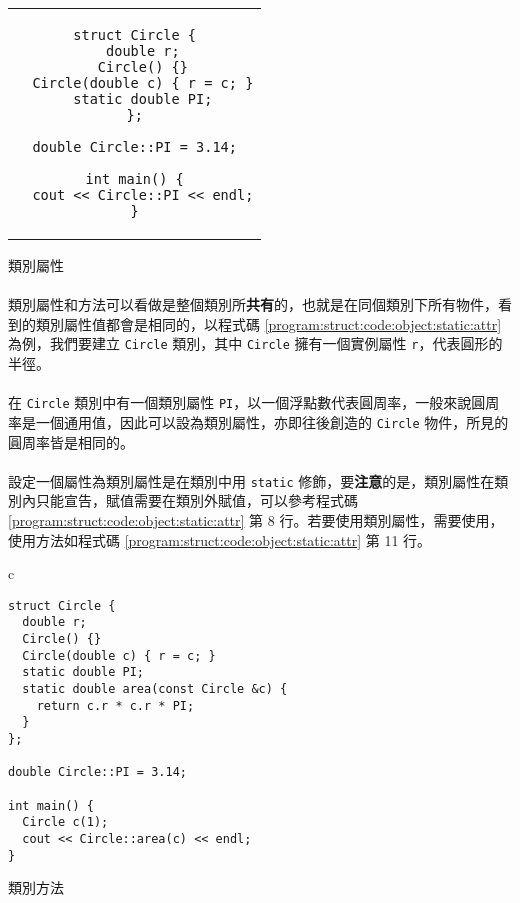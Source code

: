 \documentclass[12pt,a4paper,oneside]{report}
\begin{document}
\begin{CJK}{UTF8}{bkai}
\begin{code}[h!]
\centering
\begin{tabular}{c}
\begin{lstlisting}
struct Circle {
  double r;
  Circle() {}
  Circle(double c) { r = c; }
  static double PI;
};

double Circle::PI = 3.14;

int main() {
  cout << Circle::PI << endl;
}
\end{lstlisting}
\end{tabular}
\caption{類別屬性}
\label{program:struct:code:object:static:attr}
\end{code}

\paragraph{}類別屬性和方法可以看做是整個類別所\textbf{共有}的，也就是在同個類別下所有物件，看到的類別屬性值都會是相同的，以程式碼 \ref{program:struct:code:object:static:attr} 為例，我們要建立 \lstinline!Circle! 類別，其中 \lstinline!Circle! 擁有一個實例屬性 \lstinline!r!，代表圓形的半徑。
\paragraph{}在 \lstinline!Circle! 類別中有一個類別屬性 \lstinline!PI!，以一個浮點數代表圓周率，一般來說圓周率是一個通用值，因此可以設為類別屬性，亦即往後創造的 \lstinline!Circle! 物件，所見的圓周率皆是相同的。
\paragraph{}設定一個屬性為類別屬性是在類別中用 \lstinline!static! 修飾，要{\color{red}\textbf{注意}}的是，類別屬性在類別內只能宣告，賦值需要在類別外賦值，可以參考程式碼 \ref{program:struct:code:object:static:attr} 第 8 行。若要使用類別屬性，需要使用，使用方法如程式碼 \ref{program:struct:code:object:static:attr} 第 11 行。

\begin{code}[h!]
\centering
\begin{tabular}{c}
\begin{lstlisting}
struct Circle {
  double r;
  Circle() {}
  Circle(double c) { r = c; }
  static double PI;
  static double area(const Circle &c) {
    return c.r * c.r * PI;
  }
};

double Circle::PI = 3.14;

int main() {
  Circle c(1);
  cout << Circle::area(c) << endl;
}
\end{lstlisting}
\end{tabular}
\caption{類別方法}
\label{program:struct:code:object:static:method}
\end{code}


\end{CJK}
\end{document}
